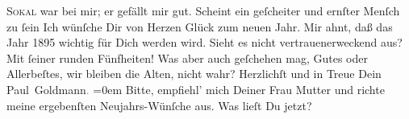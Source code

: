 \begin{ledgroupsized}[t]{13cm}
           {\pb}\textsc{Sokal} war bei mir; er gefällt mir gut. Scheint ein geſcheiter und ernſter Menſch zu
                  ſein{\dotsfour}\pend
           \pstart
           Ich wünſche Dir von Herzen Glück zum neuen Jahr. Mir ahnt, daß das Jahr
                  1895 wichtig für Dich werden wird. Sieht es nicht vertrauenerweckend
               aus? Mit ſeiner runden Fünfheiten!\pend
           \pstart
           Was aber auch geſchehen mag, Gutes oder Allerbeſtes, wir bleiben die Alten, nicht
               wahr?\pend
           \pstart
           Herzlichſt und in Treue Dein{\\[\baselineskip]}\spacefill\mbox{Paul Goldmann\textcolor{gray}{.}}\pend
           \leftskip=0em{}\pstart
           \noindent{}{\pb}Bitte, empfiehl’ mich Deiner Frau Mutter und richte \label{T_L02630-1v}\label{T_L02630-1h} meine ergebenſten Neujahrs-Wünſche aus.\pend
           \pstart
           Was lieſt Du jetzt?\pend
           
         
         \endnumbering{}\end{ledgroupsized}  \newcommand{\dateiname}{L02630}\newcommand{\titel}{Paul Goldmann an Arthur Schnitzler, 31. 12. [1894]}\newcommand{\editorInnen}{Martin Anton Müller und Laura Untner}
      
